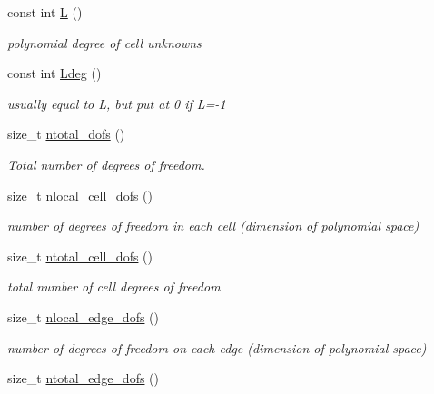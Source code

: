 \begin{DoxyCompactItemize}
\mbox{\label{classHArDCore2D_1_1HybridCore_af5aea2e23e91c582d8c8189a5bc7ae96}} 
const int \hyperlink{classHArDCore2D_1_1HybridCore_af5aea2e23e91c582d8c8189a5bc7ae96}{L} ()
\begin{DoxyCompactList}\small\item\em polynomial degree of cell unknowns \end{DoxyCompactList}\item 
\mbox{\label{classHArDCore2D_1_1HybridCore_abc772d1adc056fb4bf725f39c92edbb5}} 
const int \hyperlink{classHArDCore2D_1_1HybridCore_abc772d1adc056fb4bf725f39c92edbb5}{Ldeg} ()
\begin{DoxyCompactList}\small\item\em usually equal to L, but put at 0 if L=-\/1 \end{DoxyCompactList}\item 
size\+\_\+t \hyperlink{group__HybridCore_ga728e5b5aa3675a64e7dbc593ed9761f8}{ntotal\+\_\+dofs} ()
\begin{DoxyCompactList}\small\item\em Total number of degrees of freedom. \end{DoxyCompactList}\item 
size\+\_\+t \hyperlink{group__HybridCore_ga6faceb46cc896cd6d82a821828518730}{nlocal\+\_\+cell\+\_\+dofs} ()
\begin{DoxyCompactList}\small\item\em number of degrees of freedom in each cell (dimension of polynomial space) \end{DoxyCompactList}\item 
size\+\_\+t \hyperlink{group__HybridCore_gaf97e3efcc37ac51074c7136af3ca517b}{ntotal\+\_\+cell\+\_\+dofs} ()
\begin{DoxyCompactList}\small\item\em total number of cell degrees of freedom \end{DoxyCompactList}\item 
size\+\_\+t \hyperlink{group__HybridCore_ga6a45e5ff09d21b18874e1446cd9de9bc}{nlocal\+\_\+edge\+\_\+dofs} ()
\begin{DoxyCompactList}\small\item\em number of degrees of freedom on each edge (dimension of polynomial space) \end{DoxyCompactList}\item 
size\+\_\+t \hyperlink{group__HybridCore_ga49a703b6786215e5acf8bb59ecdbc9ea}{ntotal\+\_\+edge\+\_\+dofs} ()

\end{DoxyCompactItemize}
